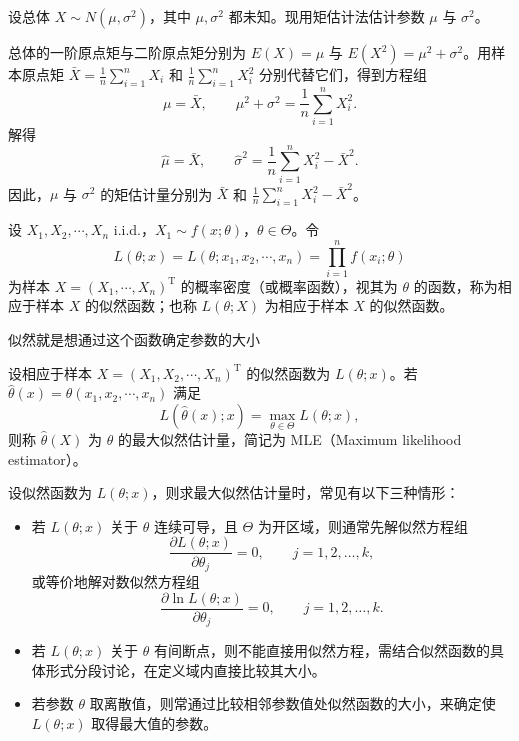 \begin{example}
设总体 \(X\sim N(\mu,\sigma^2)\)，其中 \(\mu,\sigma^2\) 都未知。现用矩估计法估计参数 \(\mu\) 与 \(\sigma^2\)。

总体的一阶原点矩与二阶原点矩分别为 \(E(X)=\mu\) 与 \(E(X^2)=\mu^2+\sigma^2\)。用样本原点矩 \(\bar X=\frac{1}{n}\sum_{i=1}^n X_i\) 和 \(\frac{1}{n}\sum_{i=1}^n X_i^2\) 分别代替它们，得到方程组
\[
\mu=\bar X,\qquad \mu^2+\sigma^2=\frac{1}{n}\sum_{i=1}^n X_i^2.
\]
解得
\[
\hat\mu=\bar X,\qquad \hat\sigma^2=\frac{1}{n}\sum_{i=1}^n X_i^2-\bar X^2.
\]
因此，\(\mu\) 与 \(\sigma^2\) 的矩估计量分别为 \(\bar X\) 和 \(\frac{1}{n}\sum_{i=1}^n X_i^2-\bar X^2\)。
\end{example}
\begin{definition}
设 \(X_1,X_2,\cdots,X_n\) i.i.d.，\(X_1\sim f(x;\theta)\)，\(\theta\in\Theta\)。令
\[
L(\theta;x)=L(\theta;x_1,x_2,\cdots,x_n)=\prod_{i=1}^n f(x_i;\theta)
\]
为样本 \(X=(X_1,\cdots,X_n)^{\mathrm T}\) 的概率密度（或概率函数），视其为 \(\theta\) 的函数，称为相应于样本 \(X\) 的似然函数；也称 \(L(\theta;X)\) 为相应于样本 \(X\) 的似然函数。
\end{definition}
\begin{dxtips}
似然就是想通过这个函数确定参数的大小    
\end{dxtips}
\begin{definition}[MLE用来确定参数的]
设相应于样本 \(X=(X_1,X_2,\cdots,X_n)^{\mathrm T}\) 的似然函数为 \(L(\theta;x)\)。若 \(\hat{\theta}(x)=\hat{\theta}(x_1,x_2,\cdots,x_n)\) 满足
\[
L(\hat{\theta}(x);x)=\max_{\theta\in\Theta} L(\theta;x),
\]
则称 \(\hat{\theta}(X)\) 为 \(\theta\) 的最大似然估计量，简记为 MLE（Maximum likelihood estimator）。
\end{definition}
\begin{theorem}[求最大似然估计量的三种常见情形]
设似然函数为 \(L(\theta;x)\)，则求最大似然估计量时，常见有以下三种情形：
\begin{itemize}
    \item 若 \(L(\theta;x)\) 关于 \(\theta\) 连续可导，且 \(\Theta\) 为开区域，则通常先解似然方程组
    \[
    \frac{\partial L(\theta;x)}{\partial \theta_j}=0,
    \qquad j=1,2,\dots,k,
    \]
    或等价地解对数似然方程组
    \[
    \frac{\partial \ln L(\theta;x)}{\partial \theta_j}=0,
    \qquad j=1,2,\dots,k.
    \]

    \item 若 \(L(\theta;x)\) 关于 \(\theta\) 有间断点，则不能直接用似然方程，需结合似然函数的具体形式分段讨论，在定义域内直接比较其大小。

    \item 若参数 \(\theta\) 取离散值，则常通过比较相邻参数值处似然函数的大小，来确定使 \(L(\theta;x)\) 取得最大值的参数。
\end{itemize}
\end{theorem}
